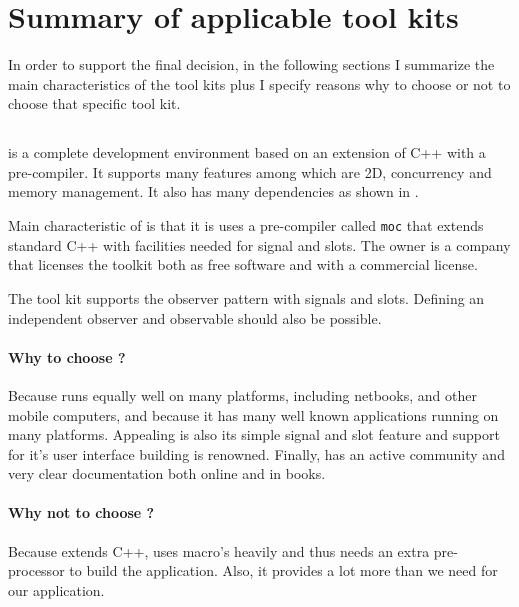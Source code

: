 \section{Summary of applicable tool kits}

In order to support the final decision, in the following sections I summarize
the main characteristics of the tool kits plus I specify reasons why to choose
or not to choose that specific tool kit.

\subsection{} 

 is a complete development environment based on an extension of C++ with
a  pre-compiler. It supports many features among which are 2D,
concurrency and memory management. It also has many dependencies as shown in
\cite{qt:qt-dep}.

Main characteristic of  is that it is uses a pre-compiler called
\texttt{moc} that extends standard C++ with facilities needed for signal and
slots. The owner is a company  that licenses the  toolkit both
as free software and with a commercial license.

The tool kit  supports the observer pattern with signals and slots.
Defining an independent observer and observable should also be possible.

\paragraph{Why to choose ?} Because  runs equally well on many
platforms, including netbooks, and other mobile computers, and because it has
many well known applications running on many platforms. Appealing is also its
simple signal and slot feature and support for it's user interface building is
renowned.  Finally,  has an active community and very clear documentation
both online and in books. 

\paragraph{Why not to choose ?} Because  extends C++, uses macro's
heavily and thus needs an extra pre-processor to build the application. Also,
it provides a lot more than we need for our application.

\subsection{}

